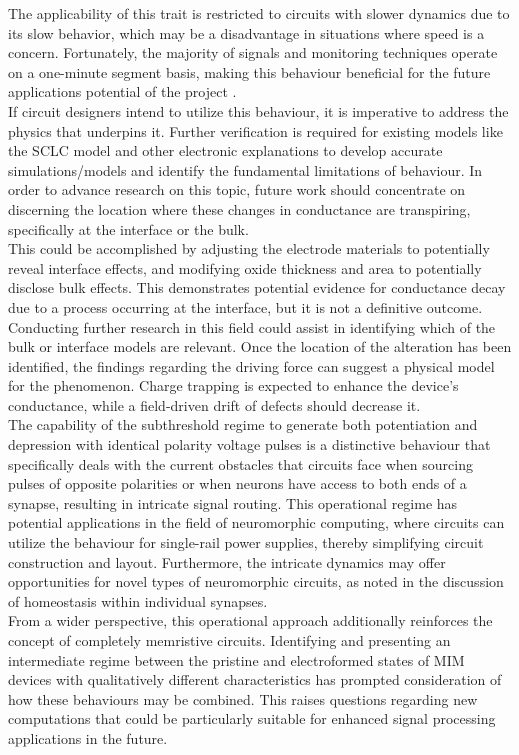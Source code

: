 \noindent The applicability of this trait is restricted to circuits with slower dynamics due to its slow behavior, which may be a disadvantage in situations where speed is a concern. Fortunately, the majority of signals and monitoring techniques operate on a one-minute segment basis, making this behaviour beneficial for the future applications potential of the project \cite{vieluf2022seizure}.\\

\noindent If circuit designers intend to utilize this behaviour, it is imperative to address the physics that underpins it. Further verification is required for existing models like the SCLC model and other electronic explanations to develop accurate simulations/models and identify the fundamental limitations of behaviour. In order to advance research on this topic, future work should concentrate on discerning the location where these changes in conductance are transpiring, specifically at the interface or the bulk.\\

\noindent This could be accomplished by adjusting the electrode materials to potentially reveal interface effects, and modifying oxide thickness and area to potentially disclose bulk effects. This demonstrates potential evidence for conductance decay due to a process occurring at the interface, but it is not a definitive outcome. Conducting further research in this field could assist in identifying which of the bulk or interface models are relevant. Once the location of the alteration has been identified, the findings regarding the driving force can suggest a physical model for the phenomenon. Charge trapping is expected to enhance the device's conductance, while a field-driven drift of defects should decrease it.\\

\noindent The capability of the subthreshold regime to generate both potentiation and depression with identical polarity voltage pulses is a distinctive behaviour that specifically deals with the current obstacles that circuits face when sourcing pulses of opposite polarities or when neurons have access to both ends of a synapse, resulting in intricate signal routing. This operational regime has potential applications in the field of neuromorphic computing, where circuits can utilize the behaviour for single-rail power supplies, thereby simplifying circuit construction and layout. Furthermore, the intricate dynamics may offer opportunities for novel types of neuromorphic circuits, as noted in the discussion of homeostasis within individual synapses.\\

\noindent From a wider perspective, this operational approach additionally reinforces the concept of completely memristive circuits. Identifying and presenting an intermediate regime between the pristine and electroformed states of MIM devices with qualitatively different characteristics has prompted consideration of how these behaviours may be combined. This raises questions regarding new computations that could be particularly suitable for enhanced signal processing applications in the future.\\
